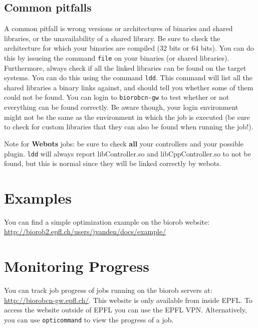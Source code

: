 \documentclass{report}
\begin{document}
\subsection{Common pitfalls}
A common pitfall is wrong versions or architectures of binaries and shared
libraries, or the unavailability of a shared library. Be sure to check the
architecture for which your binaries are compiled (32 bits or 64 bits). You
can do this by issueing the command \verb!file! on your binaries (or shared
libraries). Furthermore, always check if all the linked libraries can be found
on the target systems. You can do this using the command \verb!ldd!. This
command will list all the shared libraries a binary links against, and should
tell you whether some of them could not be found. You can login to
\verb!biorobcn-gw! to test whether or not everything can
be found correctly. Be aware though, your login environment might not be the
same as the environment in which the job is executed (be sure to check for
custom libraries that they can also be found when running the job!).

Note for \textbf{Webots} jobs: be sure to check \textbf{all} your controllers
and your possible plugin. \verb!ldd! will always report libController.so and
libCppController.so to not be found, but this is normal since they will be
linked correctly by webots.

\section{Examples}
You can find a simple optimization example on the biorob website:
\url{http://biorob2.epfl.ch/users/jvanden/docs/example/}

\section{Monitoring Progress}
You can track job progress of jobs running on the biorob servers at:
\url{http://biorobcn-gw.epfl.ch/}. This website is only available from inside
EPFL. To access the website outside of EPFL you can use the EPFL VPN.
Alternatively, you can use \verb!opticommand! to view the progress of a job.

\newpage



\end{document}
